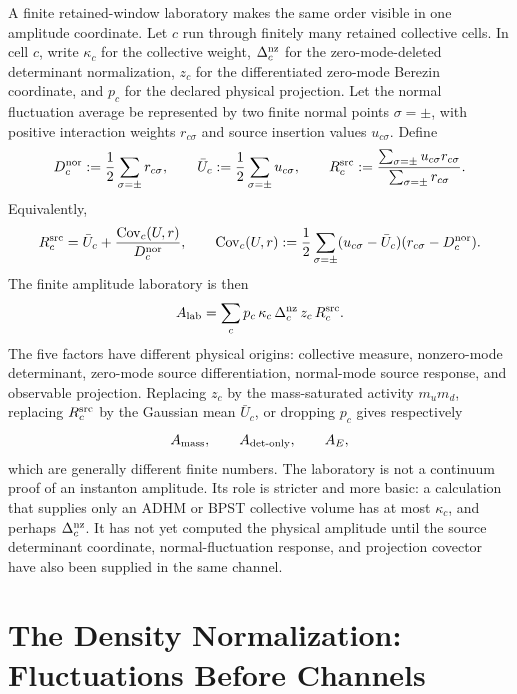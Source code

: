 \begin{example}
\label{ex:instanton-finite-source-functional-laboratory}
A finite retained-window laboratory makes the same order visible in one
amplitude coordinate.  Let \(c\) run through finitely many retained
collective cells.  In cell \(c\), write \(\kappa_c\) for the collective
weight, \(\Delta_c^{\rm nz}\) for the zero-mode-deleted determinant
normalization, \(z_c\) for the differentiated zero-mode Berezin coordinate,
and \(p_c\) for the declared physical projection.  Let the normal fluctuation
average be represented by two finite normal points \(\sigma=\pm\), with
positive interaction weights \(r_{c\sigma}\) and source insertion values
\(u_{c\sigma}\).  Define
\[
  D_c^{\rm nor}:=\frac{1}{2}\sum_{\sigma=\pm}r_{c\sigma},
  \qquad
  \bar U_c:=\frac{1}{2}\sum_{\sigma=\pm}u_{c\sigma},
  \qquad
  R_c^{\rm src}:=
  \frac{
    \sum_{\sigma=\pm}u_{c\sigma}r_{c\sigma}
  }{
    \sum_{\sigma=\pm}r_{c\sigma}
  } .
\]
Equivalently,
\[
  R_c^{\rm src}
  =
  \bar U_c+
  \frac{\operatorname{Cov}_c(U,r)}{D_c^{\rm nor}},
  \qquad
  \operatorname{Cov}_c(U,r)
  :=
  \frac{1}{2}\sum_{\sigma=\pm}
  (u_{c\sigma}-\bar U_c)(r_{c\sigma}-D_c^{\rm nor}).
\]
The finite amplitude laboratory is then
\begin{equation}
  A_{\rm lab}
  =
  \sum_c
  p_c\,\kappa_c\,\Delta_c^{\rm nz}\,z_c\,R_c^{\rm src}.
  \label{eq:instanton-finite-source-functional-laboratory}
\end{equation}
The five factors have different physical origins: collective measure,
nonzero-mode determinant, zero-mode source differentiation, normal-mode
source response, and observable projection.  Replacing \(z_c\) by the
mass-saturated activity \(m_um_d\), replacing \(R_c^{\rm src}\) by the
Gaussian mean \(\bar U_c\), or dropping \(p_c\) gives respectively
\[
  A_{\rm mass},\qquad
  A_{\rm det\text{-}only},\qquad
  A_E,
\]
which are generally different finite numbers.  The laboratory is not a
continuum proof of an instanton amplitude.  Its role is stricter and more
basic: a calculation that supplies only an ADHM or BPST collective volume has
at most \(\kappa_c\), and perhaps \(\Delta_c^{\rm nz}\).  It has not yet
computed the physical amplitude until the source determinant coordinate,
normal-fluctuation response, and projection covector have also been supplied
in the same channel.
\end{example}

\section{The Density Normalization: Fluctuations Before Channels}
\label{sec:instanton-density-gate}

